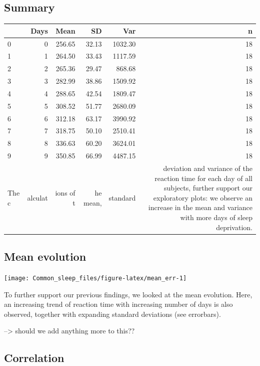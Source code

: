 \documentclass[
]{article}
\begin{document}
\hypertarget{summary}{%
\subsection{Summary}\label{summary}}

\begin{longtable}[]{@{}lrrrrr@{}}
\toprule
& Days & Mean & SD & Var & n\tabularnewline
\midrule
\endhead
0 & 0 & 256.65 & 32.13 & 1032.30 & 18\tabularnewline
1 & 1 & 264.50 & 33.43 & 1117.59 & 18\tabularnewline
2 & 2 & 265.36 & 29.47 & 868.68 & 18\tabularnewline
3 & 3 & 282.99 & 38.86 & 1509.92 & 18\tabularnewline
4 & 4 & 288.65 & 42.54 & 1809.47 & 18\tabularnewline
5 & 5 & 308.52 & 51.77 & 2680.09 & 18\tabularnewline
6 & 6 & 312.18 & 63.17 & 3990.92 & 18\tabularnewline
7 & 7 & 318.75 & 50.10 & 2510.41 & 18\tabularnewline
8 & 8 & 336.63 & 60.20 & 3624.01 & 18\tabularnewline
9 & 9 & 350.85 & 66.99 & 4487.15 & 18\tabularnewline
The c & alculat & ions of t & he mean, & standard & deviation and
variance of the reaction time for each day of all subjects, further
support our exploratory plots: we observe an increase in the mean and
variance with more days of sleep deprivation.\tabularnewline
\bottomrule
\end{longtable}

\hypertarget{mean-evolution}{%
\subsection{Mean evolution}\label{mean-evolution}}

\begin{center}\texttt{[image: Common\_sleep\_files/figure-latex/mean\_err-1]} \end{center}

To further support our previous findings, we looked at the mean
evolution. Here, an increasing trend of reaction time with increasing
number of days is also observed, together with expanding standard
deviations (see errorbars).

--\textgreater{} should we add anything more to this??

\hypertarget{correlation}{%
\subsection{Correlation}\label{correlation}}
\end{document}
